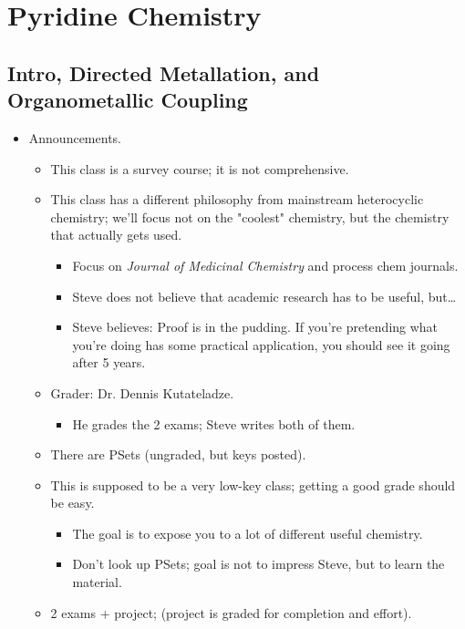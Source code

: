 \documentclass[../notes.tex]{subfiles}
\begin{document}
\chapter{Pyridine Chemistry}
\section{Intro, Directed Metallation, and Organometallic Coupling}
\begin{itemize}
    \item {}Announcements.
    \begin{itemize}
        \item This class is a survey course; it is not comprehensive.
        \item This class has a different philosophy from mainstream heterocyclic chemistry; we'll focus not on the "coolest" chemistry, but the chemistry that actually gets used.
        \begin{itemize}
            \item Focus on \emph{Journal of Medicinal Chemistry} and process chem journals.
            \item Steve does not believe that academic research has to be useful, but\dots
            \item Steve believes: Proof is in the pudding. If you're pretending what you're doing has some practical application, you should see it going after 5 years.
        \end{itemize}
        \item Grader: Dr. Dennis Kutateladze.
        \begin{itemize}
            \item He grades the 2 exams; Steve writes both of them.
        \end{itemize}
        \item There are PSets (ungraded, but keys posted).
        \item This is supposed to be a very low-key class; getting a good grade should be easy.
        \begin{itemize}
            \item The goal is to expose you to a lot of different useful chemistry.
            \item Don't look up PSets; goal is not to impress Steve, but to learn the material.
        \end{itemize}
        \item 2 exams + project; (project is graded for completion and effort).

\end{itemize}
\end{itemize}
\end{document}
